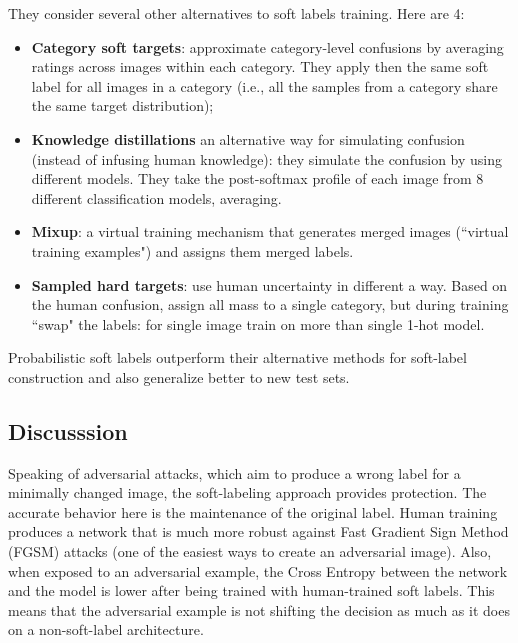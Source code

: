They consider several other alternatives to soft labels training. Here are 4:
\begin{itemize}
    \item \textbf{Category soft targets}: approximate category-level confusions by averaging ratings across images within each category. They apply then the same soft label for all images in a category (i.e., all the samples from a category share the same target distribution);
    \item \textbf{Knowledge distillations} an alternative way for simulating confusion (instead of infusing human knowledge): they simulate the confusion by using different models. They take the post-softmax profile of each image from 8 different classification models, averaging.
\end{itemize}

\begin{itemize}
    \item \textbf{Mixup}: a virtual training mechanism that generates merged images (``virtual training examples") and assigns them merged labels.
    \item \textbf{Sampled hard targets}: use human uncertainty in different a way. Based on the human confusion, assign all mass to a single category, but during training ``swap" the labels: for single image train on more than single 1-hot model.
\end{itemize}

Probabilistic soft labels outperform their alternative methods for soft-label construction and also generalize better to new test sets.

\subsection{Discusssion}
Speaking of adversarial attacks, which aim to produce a wrong label for a minimally changed image, the soft-labeling approach provides protection. The accurate behavior here is the maintenance of the original label. Human training produces a network that is much more robust against Fast Gradient Sign Method (FGSM) attacks (one of the easiest ways to create an adversarial image).
Also, when exposed to an adversarial example, the Cross Entropy between the network and the model is lower after being trained with human-trained soft labels. This means that the adversarial example is not shifting the decision as much as it does on a non-soft-label architecture.\\

